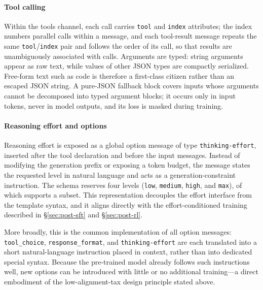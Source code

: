 \paragraph{Tool calling}
Within the tools channel, each call carries \texttt{tool} and \texttt{index} attributes; the index numbers parallel calls within a message, and each tool-result message repeats the same \texttt{tool}/\texttt{index} pair and follows the order of its call, so that results are unambiguously associated with calls. Arguments are typed: string arguments appear as raw text, while values of other JSON types are compactly serialized. Free-form text such as code is therefore a first-class citizen rather than an escaped JSON string. A pure-JSON fallback block covers inputs whose arguments cannot be decomposed into typed argument blocks; it occurs only in input tokens, never in model outputs, and its loss is masked during training.

\paragraph{Reasoning effort and options}
Reasoning effort is exposed as a global option message of type \texttt{thinking-effort}, inserted after the tool declaration and before the input messages. Instead of modifying the generation prefix or exposing a token budget, the message states the requested level in natural language and acts as a generation-constraint instruction. The schema reserves four levels (\texttt{low}, \texttt{medium}, \texttt{high}, and \texttt{max}), of which  supports a subset. This representation decouples the effort interface from the template syntax, and it aligns directly with the effort-conditioned training described in \S\ref{sec:post-sft} and \S\ref{sec:post-rl}.

More broadly, this is the common implementation of all option messages: \texttt{tool\_choice}, \texttt{response\_format}, and \texttt{thinking-effort} are each translated into a short natural-language instruction placed in context, rather than into dedicated special syntax. Because the pre-trained model already follows such instructions well, new options can be introduced with little or no additional training---a direct embodiment of the low-alignment-tax design principle stated above.
